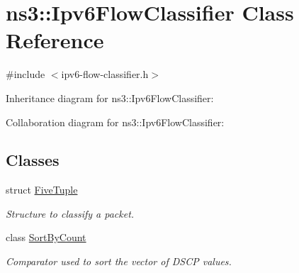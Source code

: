 \hypertarget{classns3_1_1Ipv6FlowClassifier}{}\section{ns3\+:\+:Ipv6\+Flow\+Classifier Class Reference}
\label{classns3_1_1Ipv6FlowClassifier}


{\ttfamily \#include $<$ipv6-\/flow-\/classifier.\+h$>$}



Inheritance diagram for ns3\+:\+:Ipv6\+Flow\+Classifier\+:


Collaboration diagram for ns3\+:\+:Ipv6\+Flow\+Classifier\+:
\subsection*{Classes}
\begin{DoxyCompactItemize}
\item 
struct \hyperlink{structns3_1_1Ipv6FlowClassifier_1_1FiveTuple}{Five\+Tuple}
\begin{DoxyCompactList}\small\item\em Structure to classify a packet. \end{DoxyCompactList}\item 
class \hyperlink{classns3_1_1Ipv6FlowClassifier_1_1SortByCount}{Sort\+By\+Count}
\begin{DoxyCompactList}\small\item\em Comparator used to sort the vector of D\+S\+CP values. \end{DoxyCompactList}\end{DoxyCompactItemize}
